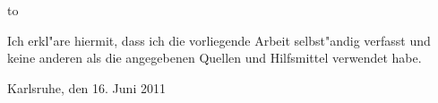 \thispagestyle{empty}
\vspace*{37\baselineskip}
\hbox to \textwidth{\hrulefill}
\par
Ich erkl"are hiermit, dass ich die vorliegende Arbeit selbst"andig verfasst und
keine anderen als die angegebenen Quellen und Hilfsmittel verwendet habe.

Karlsruhe, den 16. Juni 2011

\clearpage






